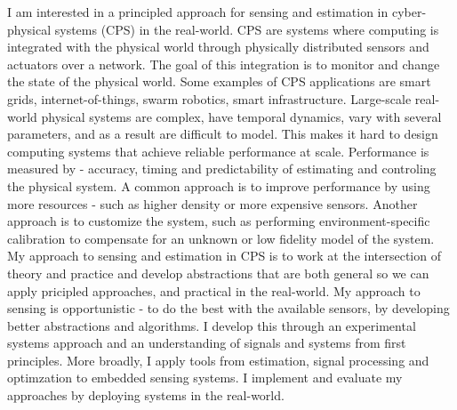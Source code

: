 \documentclass[10pt]{article}
\date{}
\begin{document}


\title{{\Large  }}
\vspace{-1em}
\maketitle

\vspace{-12em}



I am interested in a principled approach for sensing and estimation in cyber-physical systems (CPS) in the real-world. CPS are systems where
computing is integrated with the physical world through physically distributed sensors and actuators over a network. The goal of this integration is to monitor and change the state of the physical world.  %
Some examples of CPS applications are smart grids, internet-of-things, swarm robotics, smart infrastructure. Large-scale real-world physical systems are complex, have temporal dynamics, vary with several parameters, and as a result are difficult to model. This makes it hard to design computing systems that achieve reliable performance at scale. Performance is measured by - accuracy, timing and predictability of estimating and controling the physical system.  A common approach is to improve performance by using more resources - such as higher density or more expensive sensors. Another approach is to customize the system, such as performing environment-specific calibration to compensate for an unknown or low fidelity model of the system. \\

My approach to sensing and estimation in CPS is to work at the intersection of theory and practice and develop abstractions that are both general so we can apply pricipled approaches, and practical in the real-world. My approach to sensing is opportunistic - to do the best with the available sensors, by developing better abstractions and algorithms. I develop this through an experimental systems approach and an understanding of signals and systems from first principles. More broadly, I apply tools from estimation, signal processing and optimzation to embedded sensing systems. I implement and evaluate my approaches by deploying systems in the real-world. \\
\end{document}
